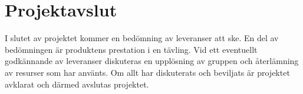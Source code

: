 \documentclass[projektplan/plan.tex]{subfiles}
\begin{document}
\section{Projektavslut}
I slutet av projektet kommer en bedömning av leveranser att ske. En del av
bedömningen är produktens prestation i en tävling. Vid ett eventuellt
godkännande av leveranser diskuteras en upplösning av gruppen och återlämning
av resurser som har använts. Om allt har diskuterats och beviljats är projektet
avklarat och därmed avslutas projektet.
\end{document}
